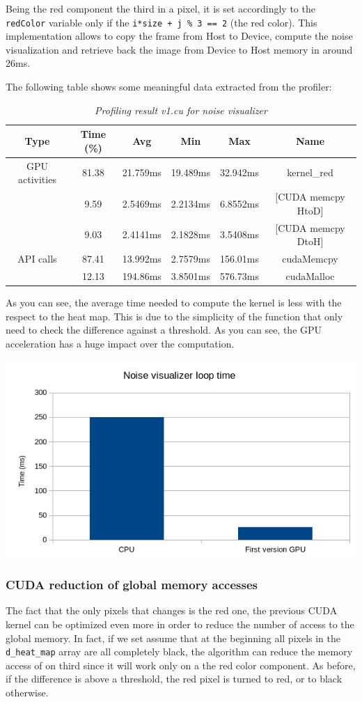 \documentclass[paper=a4, fontsize=10pt]{scrartcl}	%
\begin{document}
	Being the red component the third in a pixel, it is set accordingly to the \texttt{redColor} variable only if the \texttt{i*size + j \% 3 == 2} (the red color).\newline\newline
	This implementation allows to copy the frame from Host to Device, compute the noise visualization and retrieve back the image from Device to Host memory in around 26ms.
	
	The following table shows some meaningful data extracted from the profiler:
	\begin{table}[H]
		\centering
		\begin{center}
			\begin{tabular}{ |c|c|c|c|c|c| } 
				\hline
				\textbf{Type} & \textbf{Time} (\%) & \textbf{Avg} & \textbf{Min} & \textbf{Max} & \textbf{Name} \\ 
				\hline
				GPU activities & 81.38 & 21.759ms & 19.489ms & 32.942ms & kernel\_red \\ 
				& 9.59 & 2.5469ms & 2.2134ms & 6.8552ms & [CUDA memcpy HtoD] \\ 
				& 9.03 & 2.4141ms & 2.1828ms & 3.5408ms & [CUDA memcpy DtoH] \\ 
				\hline
				API calls & 87.41 & 13.992ms &  2.7579ms & 156.01ms & cudaMemcpy \\ 
				& 12.13 & 194.86ms  & 3.8501ms & 576.73ms & cudaMalloc \\ 
				\hline
			\end{tabular}
		\end{center}
		\label{fig:table_v1_red}
		\caption{\textit{Profiling result v1.cu for noise visualizer}}
	\end{table}
	As you can see, the average time needed to compute the kernel is less with the respect to the heat map. This is due to the simplicity of the function that only need to check the difference against a threshold. As you can see, the GPU acceleration has a huge impact over the computation.
	\begin{center}
		\includegraphics[width=0.35\linewidth]{images/heatmap/noise1}
	\end{center}
	
	
	\subsubsection{CUDA reduction of global memory accesses}
	The fact that the only pixels that changes is the red one, the previous CUDA kernel can be optimized even more in order to reduce the number of access to the global memory. In fact, if we set assume that at the beginning all pixels in the \texttt{d\_heat\_map} array are all completely black, the algorithm can reduce the memory access of on third since it will work only on a the red color component. As before, if the difference is above a threshold, the red pixel is turned to red, or to black otherwise.
\end{document}
